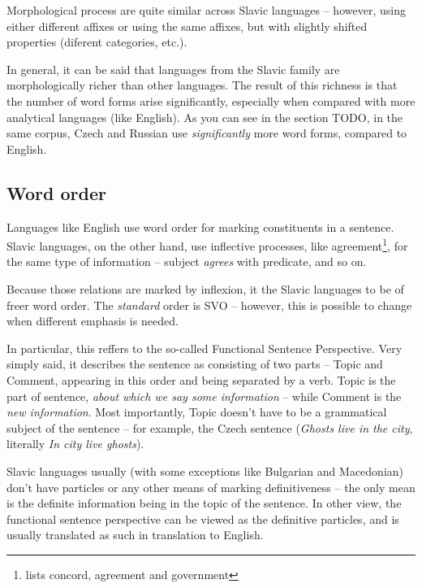 Morphological process are quite similar across Slavic languages -- however, using either different affixes or using the same affixes, but with slightly shifted properties (diferent categories, etc.).


In general, it can be said that languages from the Slavic family are morphologically richer than other languages. The result of this richness is that the number of word forms arise significantly, especially when compared with more analytical languages (like English). As you can see in the section TODO, in the same corpus, Czech and Russian use \emph{significantly} more word forms, compared to English.
\subsection{Word order}

Languages like English use word order for marking constituents
in a sentence. Slavic languages, on the other hand, use inflective processes, like agreement\footnote{\cite{sussex2011slavic} lists concord, agreement and government}, for the same type of information -- subject \emph{agrees} with predicate, and so on.

Because those relations are marked by inflexion, it  the Slavic languages to be of freer word order. The \emph{standard} order is SVO -- however, this is possible to change when different emphasis is needed.

In particular, this reffers to the so-called Functional Sentence Perspective. Very simply said, it describes the sentence as consisting of two parts -- Topic and Comment, appearing in this order and being separated by a verb. Topic is the part of sentence, \emph{about which we say some information} -- while Comment is the \emph{new information}. Most importantly, Topic doesn't have to be a grammatical subject of the sentence -- for example, the Czech sentence  (\emph{Ghosts live in the city}, literally \emph{In city live ghosts}).

Slavic languages usually (with some exceptions like Bulgarian and Macedonian) don't have particles or any other means of marking definitiveness -- the only mean is the definite information being in the topic of the sentence. In other view, the functional sentence perspective can be viewed as  the definitive particles, and is usually translated as such in translation to English.

